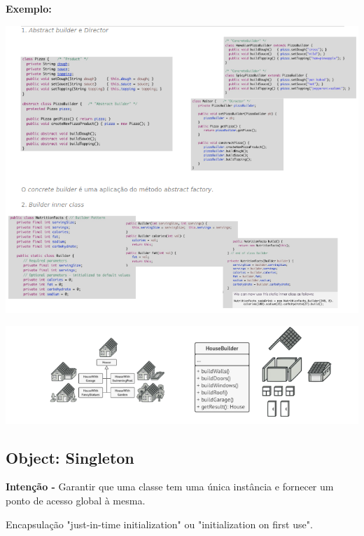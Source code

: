 \documentclass{article}
\begin{document}
\begin{flushleft}
    \textbf{Exemplo:}

    \begin{center}
        \includegraphics[scale=0.5]{Images/32.png}
    \end{center}

    \pagebreak

    \begin{center}
        \includegraphics[scale=0.5]{Images/33.png}
    \end{center}
    
\end{flushleft}


\subsection{Object: Singleton}


\begin{flushleft}
    \textbf{Intenção -} Garantir que uma classe tem uma única instância e fornecer um ponto de acesso
    global à mesma.

    Encapsulação "just-in-time initialization" ou "initialization on first use".
\end{flushleft}
\end{document}
